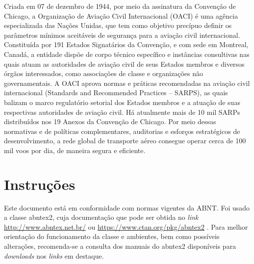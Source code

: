Criada em 07 de dezembro de 1944, por meio da assinatura da Convenção de
Chicago, a Organização de Aviação Civil Internacional (OACI) é uma agência
especializada das Nações Unidas, que tem como objetivo precípuo definir os parâmetros
mínimos aceitáveis de segurança para a aviação civil internacional. Constituída por 191
Estados Signatários da Convenção, e com sede em Montreal, Canadá, a entidade dispõe
de corpo técnico específico e instâncias consultivas nas quais atuam as autoridades de
aviação civil de seus Estados membros e diversos órgãos interessados, como associações
de classe e organizações não governamentais.
A OACI aprova normas e práticas recomendadas na aviação civil internacional
(Standards and Recommended Practices – SARPS), as quais balizam o marco regulatório
setorial dos Estados membros e a atuação de suas respectivas autoridades de aviação civil.
Há atualmente mais de 10 mil SARPs distribuídos nos 19 Anexos da Convenção de
Chicago. Por meio dessas normativas e de políticas complementares, auditorias e esforços
estratégicos de desenvolvimento, a rede global de transporte aéreo consegue operar cerca
de 100 mil voos por dia, de maneira segura e eficiente.

\nocite{Rampazzo2005,Carvalho1989}

\section{Instruções}

Este documento está em conformidade com normas vigentes da ABNT. Foi usado a classe abntex2, cuja documentação que pode ser obtida no \textit{link}  \url{http://www.abntex.net.br/} ou \url{https://www.ctan.org/pkg/abntex2} . Para melhor orientação do funcionamento da classe e ambientes, bem como possíveis alterações, recomenda-se a consulta dos manuais do abntex2 disponíveis para \textit{downloads} nos \textit{links}  em destaque. 




